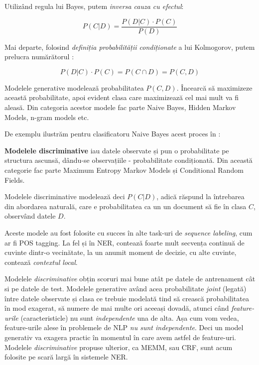 Utilizând regula lui Bayes, putem \textit{inversa cauza cu efectul}:

\begin{equation}
\label{eq:bayes-rule}
P(C|D) = \frac{P(D|C) \cdot P(C)}{P(D)}
\end{equation}

Mai departe, folosind \textit{definiția probabilității condiționate} a lui Kolmogorov, putem prelucra numărătorul :


\begin{equation}
P(D|C) \cdot P(C) = P(C\cap D) = P(C,D)
\end{equation}


Modelele generative modelează probabilitatea $P(C,D)$. Încearcă să maximizeze această probabilitate, apoi evident clasa care maximizează cel mai mult va fi aleasă. Din categoria acestor modele fac parte Naive Bayes, Hidden Markov Models, n-gram models etc.

De exemplu ilustrăm pentru clasificatoru Naive Bayes acest proces în :



\textbf{Modelele discriminative} iau datele observate și pun o probabilitate pe structura ascunsă, dându-se observațiile - probabilitate condiționată. Din această categorie fac parte Maximum Entropy Markov Models și Conditional Random Fields.\cite{Mccallum00maximumentropy}\cite{Lafferty01conditionalrandom}

Modelele discriminative modelează deci $P(C|D)$, adică răspund la întrebarea din abordarea naturală, care e probabilitatea ca un un document să fie în clasa $C$, observând datele $D$.


Aceste modele au fost folosite cu succes în alte task-uri de \textit{sequence labeling}, cum ar fi POS tagging. La fel și în NER, contează foarte mult secvența continuă de cuvinte dintr-o vecinătate, la un anumit moment de decizie, cu alte cuvinte, contează \textit{contextul local}.

Modelele \textit{discriminative} obțin scoruri mai bune atât pe datele de antrenament cât si pe datele de test. Modelele generative având acea probabilitate \textit{joint} (legată) între datele observate și clasa ce trebuie modelată tind să crească probabilitatea în mod exagerat, să numere de mai multe ori aceeași dovadă, atunci când \textit{feature-urile} (caracteristicle) nu sunt \textit{independente} una de alta. Așa cum vom vedea, feature-urile alese în problemele de NLP \textit{nu sunt independente}. Deci un model generativ va exagera practic în momentul în care avem astfel de feature-uri. Modelele \textit{discriminative} propuse ulterior, ca MEMM, sau CRF, sunt acum folosite pe scară largă în sistemele NER.

